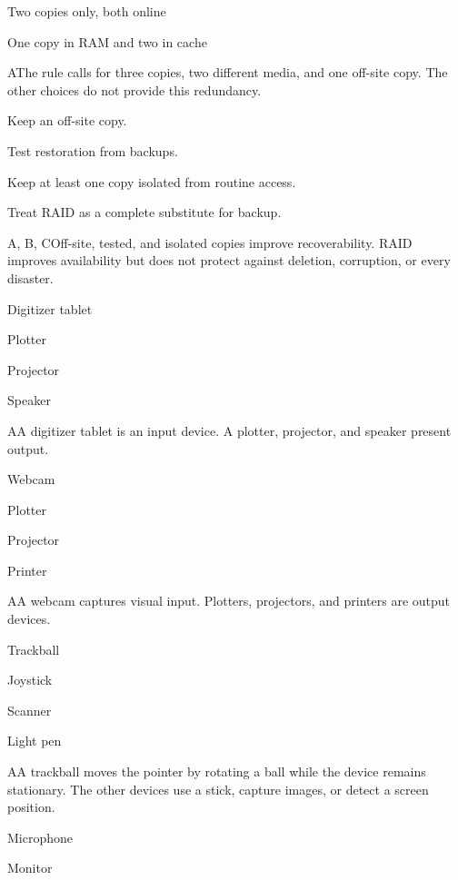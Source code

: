 \begin{enumerate}[label=\textbf{Q\arabic*.}, leftmargin=*]
{   \item Two copies only, both online
   \item One copy in RAM and two in cache}
  {A}{The rule calls for three copies, two different media, and one off-site copy. The other choices do not provide this redundancy.}
  {\item Keep an off-site copy.
   \item Test restoration from backups.
   \item Keep at least one copy isolated from routine access.
   \item Treat RAID as a complete substitute for backup.}
  {A, B, C}{Off-site, tested, and isolated copies improve recoverability. RAID improves availability but does not protect against deletion, corruption, or every disaster.}
\fi
\ifnum{}
  {\item Digitizer tablet
   \item Plotter
   \item Projector
   \item Speaker}
  {A}{A digitizer tablet is an input device. A plotter, projector, and speaker present output.}
  {\item Webcam
   \item Plotter
   \item Projector
   \item Printer}
  {A}{A webcam captures visual input. Plotters, projectors, and printers are output devices.}
  {\item Trackball
   \item Joystick
   \item Scanner
   \item Light pen}
  {A}{A trackball moves the pointer by rotating a ball while the device remains stationary. The other devices use a stick, capture images, or detect a screen position.}
  {\item Microphone
   \item Monitor
}
\end{enumerate}
